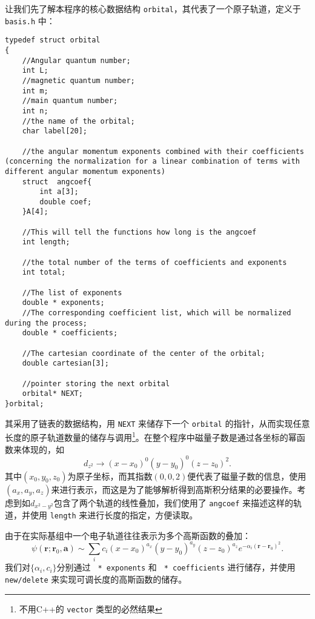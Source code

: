 \documentclass[12pt,a4paper,openany,twoside]{article}
\numberwithin{equation}{section}
\begin{document}
        让我们先了解本程序的核心数据结构 \lstinline$orbital$，其代表了一个原子轨道，定义于 \lstinline$basis.h$ 中：
        \begin{lstlisting}
typedef struct orbital
{
    //Angular quantum number;
    int L;
    //magnetic quantum number;
    int m;
    //main quantum number;
    int n;
    //the name of the orbital;
    char label[20];

    //the angular momentum exponents combined with their coefficients (concerning the normalization for a linear combination of terms with different angular momentum exponents)
    struct  angcoef{
        int a[3];
        double coef;
    }A[4];

    //This will tell the functions how long is the angcoef
    int length;

    //the total number of the terms of coefficients and exponents 
    int total;

    //The list of exponents
    double * exponents;
    //The corresponding coefficient list, which will be normalized during the process;
    double * coefficients;

    //The cartesian coordinate of the center of the orbital;
    double cartesian[3];

    //pointer storing the next orbital
    orbital* NEXT;
}orbital;
        \end{lstlisting}
        其采用了链表的数据结构，用 \lstinline$NEXT$ 来储存下一个 \lstinline$orbital$ 的指针，从而实现任意长度的原子轨道数量的储存与调用\footnote{不用C++的 \lstinline$vector$ 类型的必然结果}。在整个程序中磁量子数是通过各坐标的幂函数来体现的，如
        \[
            d_{z^2} \rightarrow (x-x_0)^0 (y-y_0)^0 (z-z_0)^2.
        \]
        其中$(x_0,y_0,z_0)$为原子坐标，而其指数$(0,0,2)$便代表了磁量子数的信息，使用$(a_x,a_y,a_z)$来进行表示，而这是为了能够解析得到高斯积分结果的必要操作。考虑到如$d_{x^2-y^2}$包含了两个轨道的线性叠加，我们使用了 \lstinline$angcoef$ 来描述这样的轨道，并使用 \lstinline$length$ 来进行长度的指定，方便读取。

        由于在实际基组中一个电子轨道往往表示为多个高斯函数的叠加：
        \begin{equation}
            \psi (\boldsymbol{r};\boldsymbol{r}_0,\boldsymbol{a}) \sim \sum_i c_i (x-x_0)^{a_x}(y-y_0)^{a_y}(z-z_0)^{a_z} e^{- \alpha_i (\boldsymbol{r} - \boldsymbol{r}_0)^2}.
        \end{equation}
        我们对$\{\alpha_i,c_i\}$分别通过 \lstinline$ * exponents$ 和 \lstinline$ * coefficients$ 进行储存，并使用 \lstinline$new/delete$ 来实现可调长度的高斯函数的储存。
\end{document}
